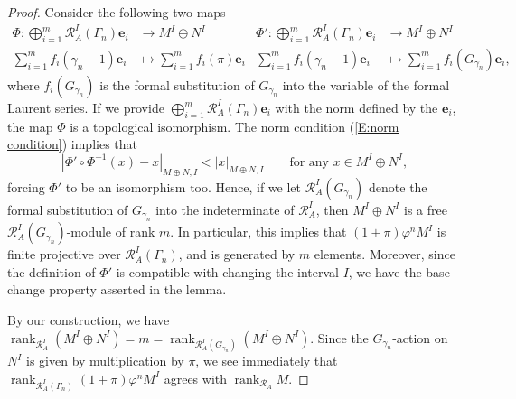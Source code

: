 \documentclass[12pt]{article}
\theoremstyle{definition}
\numberwithin{equation}{theorem}
\newcommand{\calR}{\mathcal{R}}
\newcommand{\bbe}{\mathbf{e}}
\DeclareMathOperator{\rank}{rank}
\begin{document}
\begin{proof}
Consider the following two maps
\begin{align*}
\Phi: \bigoplus_{i=1}^m \calR_A^I(\Gamma_n)\bbe_i &\longrightarrow M^I \oplus N^I & \Phi': \bigoplus_{i=1}^m \calR_A^I(\Gamma_n)\bbe_i &\longrightarrow M^I \oplus N^I
\\
\sum_{i=1}^m f_i(\gamma_n-1) \bbe_i& \longmapsto \sum_{i=1}^m f_i(\pi) \bbe_i & \sum_{i=1}^m f_i(\gamma_n-1) \bbe_i& \longmapsto \sum_{i=1}^m f_i(G_{\gamma_n}) \bbe_i,
\end{align*}
where $f_i(G_{\gamma_n})$ is the formal substitution of $G_{\gamma_n}$
into the variable of the formal Laurent series.  If we provide
$\bigoplus_{i=1}^m \calR_A^I(\Gamma_n)\bbe_i$ with the norm defined by
the $\bbe_i$, the map $\Phi$ is a topological isomorphism. The norm
condition (\ref{E:norm condition}) implies that
\[
|\Phi' \circ \Phi^{-1} (x) - x |_{M \oplus N,I} < |x|_{M \oplus N,I}
\qquad
\text{for any } x \in M^I \oplus N^I,
\]
forcing $\Phi'$ to be an isomorphism too.  Hence, if we let
$\calR_A^I(G_{\gamma_n})$ denote the formal substitution of
$G_{\gamma_n}$ into the indeterminate of $\calR_A^I$, then $M^I \oplus
N^I$ is a free $\calR_A^I(G_{\gamma_n})$-module of rank $m$. In
particular, this implies that $(1+\pi)\varphi^n M^I$ is finite
projective over $\calR_A^I(\Gamma_n)$, and is generated by $m$
elements.  Moreover, since the definition of $\Phi'$ is compatible
with changing the interval $I$, we have the base change property
asserted in the lemma.

By our construction, we have $\rank_{\calR_A^I}(M^I \oplus N^I) = m =  \rank_{\calR_A^I(G_{\gamma_n})}(M^I \oplus N^I)$. Since the $G_{\gamma_n}$-action on $N^I$ is given by multiplication by $\pi$, we see immediately that $\rank_{\calR_A^I(\Gamma_n)}(1+\pi)\varphi^n M^I$ agrees with $\rank_{\calR_A}M$.
\end{proof}
\end{document}
